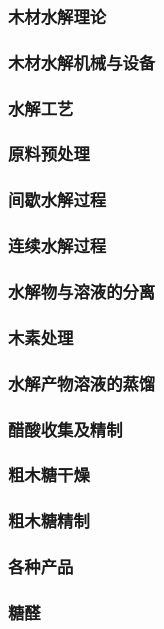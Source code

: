 \documentclass[UTF8]{../../ApplicationUniverse}
\begin{document}
        \subsubsection{木材水解理论}
        \subsubsection{木材水解机械与设备}
        \subsubsection{水解工艺}
            \subsubsection{原料预处理}
            \subsubsection{间歇水解过程}
            \subsubsection{连续水解过程}
            \subsubsection{水解物与溶液的分离}
            \subsubsection{木素处理}
            \subsubsection{水解产物溶液的蒸馏}
            \subsubsection{醋酸收集及精制}
            \subsubsection{粗木糖干燥}
            \subsubsection{粗木糖精制}
        \subsubsection{各种产品}
            \subsubsection{糖醛}
\end{document}
